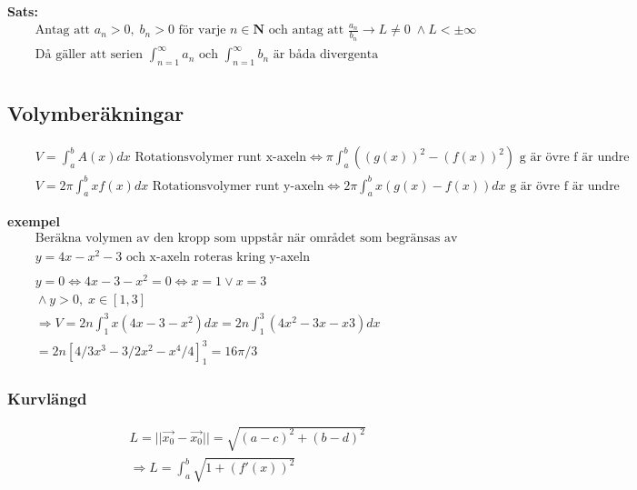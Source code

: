 \textbf{Sats: }
\begin{align*}
  &\quad  \text{Antag att } a_n >0, \; b_n >0 \text{ för varje } n \in \mathbf{N} \text{ och antag att } 
  \frac{a_n}{b_n}\to L \neq 0 \; \land L < \pm\infty\\
  &\quad  \text{Då gäller att serien } \int_{n=1}^{\infty}a_n \text{ och }
  \int_{n=1}^{\infty}b_n \text{ är båda divergenta} \\
\end{align*}



\newpage


\subsection{Volymberäkningar}
\begin{align*}
  &\quad  V = \int_a^b A(x)dx \text{ Rotationsvolymer runt x-axeln}
  \Leftrightarrow \pi \int_a^b ({(g(x))}^2 - {(f(x))}^2) \text{ g är övre f är undre} \\
  &\quad  V = 2\pi \int_a^b xf(x)dx \text{ Rotationsvolymer runt y-axeln}
  \Leftrightarrow 2\pi \int_a^b x(g(x)-f(x))dx \text{ g är övre f är undre}
\end{align*}

\textbf{exempel}
\begin{align*}
  &\quad  \text{Beräkna volymen av den kropp som uppstår när området som begränsas av kurnvan }  \\
  &\quad  y=4x-x^2-3 \text{ och x-axeln roteras kring y-axeln} \\
  &\quad  \\
  &\quad  y=0 \Leftrightarrow 4x-3-x^2=0 \Leftrightarrow x=1 \lor x=3 \\
  &\quad  \land y>0, \; x\in[1,3] \\
  &\quad  \Rightarrow V = 2n\int_1^3 x(4x-3-x^2)dx = 2n \int_1^3(4x^2-3x-x3)dx \\
  &\quad  = 2n[4/3x^3-3/2x^2-x^4/4]_1^3 = 16\pi/3
\end{align*}


\subsubsection{Kurvlängd}
\begin{align*}
  &\quad  L=||\vec{x_0} -\vec{x_0}|| = \sqrt{{(a-c)}^2 + {(b-d)}^2} \\
  &\quad  \Rightarrow L= \int_a^b \sqrt{1+{(f'(x))}^2} \\
\end{align*}

